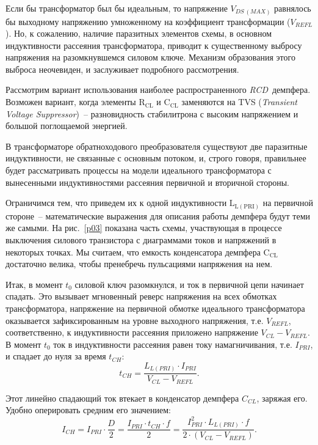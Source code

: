 Если бы трансформатор был бы идеальным, то напряжение \( V_{DS\,(MAX)} \)
равнялось бы выходному напряжению умноженному на коэффициент трансформации
(\( V_{REFL} \)). Но, к сожалению, наличие паразитных элементов схемы, в
основном индуктивности рассеяния трансформатора, приводит к существенному
выбросу напряжения на разомкнувшемся силовом ключе. Механизм образования этого
выброса неочевиден, и заслуживает подробного рассмотрения.
		
Рассмотрим вариант использования наиболее распространенного \emph{RCD}~демпфера.
Возможен вариант, когда элементы \( \mathrm{R_{CL}} \) и \( \mathrm{C_{CL}} \)
заменяются на TVS (\emph{Transient Voltage Suppressor})~-- разновидность
стабилитрона с высоким напряжением и большой поглощаемой энергией.
		
В трансформаторе обратноходового преобразователя существуют две паразитные
индуктивности, не связанные с основным потоком, и, строго говоря, правильнее
будет рассматривать процессы на модели идеального трансформатора с вынесенными
индуктивностями рассеяния первичной и вторичной стороны.

Ограничимся тем, что приведем их к одной индуктивности \( \mathrm{L_{L(PRI)}} \)
на первичной стороне~-- математические выражения для описания работы демпфера
будут теми же самыми. На рис.~\ref{p03} показана часть схемы, участвующая в
процессе выключения силового транзистора с диаграммами токов и напряжений в
некоторых точках. Мы считаем, что емкость конденсатора демпфера
\( \mathrm{C_{CL}} \) достаточно велика, чтобы пренебречь пульсациями напряжения
на нем.

Итак, в момент \( t_0 \) силовой ключ разомкнулся, и ток в первичной цепи
начинает спадать. Это вызывает мгновенный реверс напряжения на всех обмотках
трансформатора, напряжение на первичной обмотке идеального трансформатора
оказывается зафиксированным на уровне выходного напряжения, т.е. \( V_{REFL} \),
соответственно, к индуктивности рассеяния приложено напряжение
\( V_{CL} - V_{REFL} \). В момент \( t_0 \) ток в индуктивности рассеяния равен
току намагничивания, т.е. \( I_{PRI} \), и спадает до нуля за время \( t_{CH} \):
\begin{equation}
	t_{CH} = \frac{L_{L(PRI)}\cdot I_{PRI}}{V_{CL} - V_{REFL}}.
\end{equation}

Этот линейно спадающий ток втекает в конденсатор демпфера \( C_{CL} \), заряжая
его. Удобно оперировать средним его значением:
\begin{equation}
	I_{CH} = I_{PRI}\cdot\frac{D}{2} = \frac{I_{PRI}\cdot t_{CH}\cdot f}{2} =
	\frac{I_{PRI}^2\cdot L_{L(PRI)}\cdot f}{2\cdot (V_{CL} - V_{REFL})}.
\end{equation}

